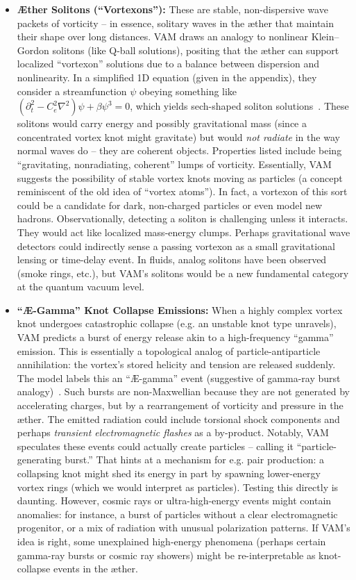 \documentclass[a4paper,12pt]{article}
\begin{document}
\begin{itemize}
\item 
\textbf{Æther Solitons (“Vortexons”):} These are stable, non-dispersive wave packets of vorticity – in essence, solitary waves in the æther that maintain their shape over long distances. VAM draws an analogy to nonlinear Klein–Gordon solitons (like Q-ball solutions), positing that the æther can support localized “vortexon” solutions due to a balance between dispersion and nonlinearity. In a simplified 1D equation (given in the appendix), they consider a streamfunction $\psi$ obeying something like $(\partial_t^2 - C_e^2 \nabla^2)\psi + \beta \psi^3 = 0$, which yields sech-shaped soliton solutions~\cite{vamcore}. These solitons would carry energy and possibly gravitational mass (since a concentrated vortex knot might gravitate) but would \textit{not radiate} in the way normal waves do – they are coherent objects. Properties listed include being “gravitating, nonradiating, coherent” lumps of vorticity. Essentially, VAM suggests the possibility of stable vortex knots moving as particles (a concept reminiscent of the old idea of “vortex atoms”). In fact, a vortexon of this sort could be a candidate for dark, non-charged particles or even model new hadrons. Observationally, detecting a soliton is challenging unless it interacts. They would act like localized mass-energy clumps. Perhaps gravitational wave detectors could indirectly sense a passing vortexon as a small gravitational lensing or time-delay event. In fluids, analog solitons have been observed (smoke rings, etc.), but VAM’s solitons would be a new fundamental category at the quantum vacuum level.

\item 
\textbf{“Æ-Gamma” Knot Collapse Emissions:} When a highly complex vortex knot undergoes catastrophic collapse (e.g. an unstable knot type unravels), VAM predicts a burst of energy release akin to a high-frequency “gamma” emission. This is essentially a topological analog of particle-antiparticle annihilation: the vortex’s stored helicity and tension are released suddenly. The model labels this an “Æ-gamma” event (suggestive of gamma-ray burst analogy)~\cite{vamcore}. Such bursts are non-Maxwellian because they are not generated by accelerating charges, but by a rearrangement of vorticity and pressure in the æther. The emitted radiation could include torsional shock components and perhaps \textit{transient electromagnetic flashes} as a by-product. Notably, VAM speculates these events could actually create particles – calling it “particle-generating burst.” That hints at a mechanism for e.g. pair production: a collapsing knot might shed its energy in part by spawning lower-energy vortex rings (which we would interpret as particles). Testing this directly is daunting. However, cosmic rays or ultra-high-energy events might contain anomalies: for instance, a burst of particles without a clear electromagnetic progenitor, or a mix of radiation with unusual polarization patterns. If VAM’s idea is right, some unexplained high-energy phenomena (perhaps certain gamma-ray bursts or cosmic ray showers) might be re-interpretable as knot-collapse events in the æther.


\end{itemize}
\end{document}
